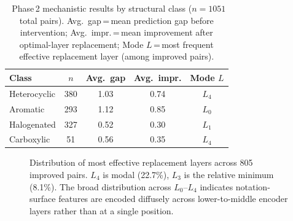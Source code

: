 \documentclass[twoside,twocolumn,9pt]{article}
\begin{document}
\begin{table}[h]
\small
\caption{\ Phase\,2 mechanistic results by structural class ($n=1051$ total pairs). Avg.\ gap\,=\,mean prediction gap before intervention; Avg.\ impr.\,=\,mean improvement after optimal-layer replacement; Mode $L$\,=\,most frequent effective replacement layer (among improved pairs).}
\label{tbl:phase2}
\begin{tabular*}{0.48\textwidth}{@{\extracolsep{\fill}}lcccc}
\hline
Class & $n$ & Avg.\ gap & Avg.\ impr. & Mode $L$ \\
\hline
Heterocyclic & 380 & 1.03 & 0.74 & $L_4$ \\
Aromatic     & 293 & 1.12 & 0.85 & $L_0$ \\
Halogenated  & 327 & 0.52 & 0.30 & $L_1$ \\
Carboxylic   &  51 & 0.56 & 0.35 & $L_4$ \\
\hline
\end{tabular*}
\end{table}

\begin{figure}[h]
\centering
{}
\caption{Distribution of most effective replacement layers across 805 improved pairs. $L_4$ is modal (22.7\%), $L_3$ is the relative minimum (8.1\%). The broad distribution across $L_0$--$L_4$ indicates notation-surface features are encoded diffusely across lower-to-middle encoder layers rather than at a single position.}
\label{fig:layers}
\end{figure}
\end{document}
